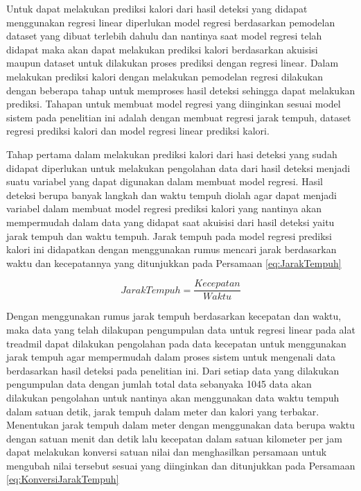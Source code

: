 Untuk dapat melakukan prediksi kalori dari hasil deteksi yang didapat menggunakan regresi linear diperlukan model regresi berdasarkan pemodelan dataset yang dibuat terlebih dahulu dan nantinya saat model regresi telah didapat maka akan dapat melakukan prediksi kalori berdasarkan akuisisi maupun dataset untuk dilakukan proses prediksi dengan regresi linear. Dalam melakukan prediksi kalori dengan melakukan pemodelan regresi dilakukan dengan beberapa tahap untuk memproses hasil deteksi sehingga dapat melakukan prediksi. Tahapan untuk membuat model regresi yang diinginkan sesuai model sistem pada penelitian ini adalah dengan membuat regresi jarak tempuh, dataset regresi prediksi kalori dan model regresi linear prediksi kalori.

Tahap pertama dalam melakukan prediksi kalori dari hasi deteksi yang sudah didapat diperlukan untuk melakukan pengolahan data dari hasil deteksi menjadi suatu variabel yang dapat digunakan dalam membuat model regresi. Hasil deteksi berupa banyak langkah dan waktu tempuh diolah agar dapat menjadi variabel dalam membuat model regresi prediksi kalori yang nantinya akan mempermudah dalam data yang didapat saat akuisisi dari hasil deteksi yaitu jarak tempuh dan waktu tempuh. Jarak tempuh pada model regresi prediksi kalori ini didapatkan dengan menggunakan rumus mencari jarak berdasarkan waktu dan kecepatannya yang ditunjukkan pada Persamaan \ref{eq:JarakTempuh}

\begin{equation}
  \label{eq:JarakTempuh}
  Jarak Tempuh = \frac{Kecepatan}{Waktu}
\end{equation}

Dengan menggunakan rumus jarak tempuh berdasarkan kecepatan dan waktu, maka data yang telah dilakupan pengumpulan data untuk regresi linear pada alat treadmil dapat dilakukan pengolahan pada data kecepatan untuk menggunakan jarak tempuh agar mempermudah dalam proses sistem untuk mengenali data berdasarkan hasil deteksi pada penelitian ini. Dari setiap data yang dilakukan pengumpulan data dengan jumlah total data sebanyaka 1045 data akan dilakukan pengolahan untuk nantinya akan menggunakan data waktu tempuh dalam satuan detik, jarak tempuh dalam meter dan kalori yang terbakar. Menentukan jarak tempuh dalam meter dengan menggunakan data berupa waktu dengan satuan menit dan detik lalu kecepatan dalam satuan kilometer per jam dapat melakukan konversi satuan nilai dan menghasilkan persamaan untuk mengubah nilai tersebut sesuai yang diinginkan dan ditunjukkan pada Persamaan \ref{eq:KonversiJarakTempuh}

